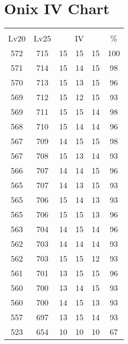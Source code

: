 \documentclass{article}%
\begin{document}
%
\normalsize%
\section{Onix IV Chart}%
\label{sec:Onix IV Chart}%
\renewcommand{\arraystretch}{1.5}%
\begin{tabular}{|c|c|c|c|c|c|}%
\hline%
\multicolumn{6}{|c|}{\textcolor{white}{ 
\linebreak{Onix}
}%
\cellcolor{black}}\\%
\multicolumn{1}{|c}{Lv20}&\multicolumn{1}{c|}{Lv25}&\multicolumn{3}{c|}{IV}&\multicolumn{1}{|c|}{\%}\\%
\hline%
\rowcolor{color100}%
572&715&15&15&15&100\\%
\hline%
\rowcolor{color98}%
571&714&15&14&15&98\\%
\hline%
\rowcolor{color96}%
570&713&15&13&15&96\\%
\hline%
\rowcolor{color93}%
569&712&15&12&15&93\\%
\hline%
\rowcolor{color98}%
569&711&15&15&14&98\\%
\hline%
\rowcolor{color96}%
568&710&15&14&14&96\\%
\hline%
\rowcolor{color98}%
567&709&14&15&15&98\\%
\hline%
\rowcolor{color93}%
567&708&15&13&14&93\\%
\hline%
\rowcolor{color96}%
566&707&14&14&15&96\\%
\hline%
\rowcolor{color93}%
565&707&14&13&15&93\\%
\hline%
\rowcolor{color93}%
565&706&15&14&13&93\\%
\hline%
\rowcolor{color96}%
565&706&15&15&13&96\\%
\hline%
\rowcolor{color96}%
563&704&14&15&14&96\\%
\hline%
\rowcolor{color93}%
562&703&14&14&14&93\\%
\hline%
\rowcolor{color93}%
562&703&15&15&12&93\\%
\hline%
\rowcolor{color96}%
561&701&13&15&15&96\\%
\hline%
\rowcolor{color93}%
560&700&13&14&15&93\\%
\hline%
\rowcolor{color93}%
560&700&14&15&13&93\\%
\hline%
\rowcolor{color93}%
557&697&13&15&14&93\\%
\hline%
\rowcolor{color91}%
523&654&10&10&10&67\\%
\end{tabular}

%
\end{document}
